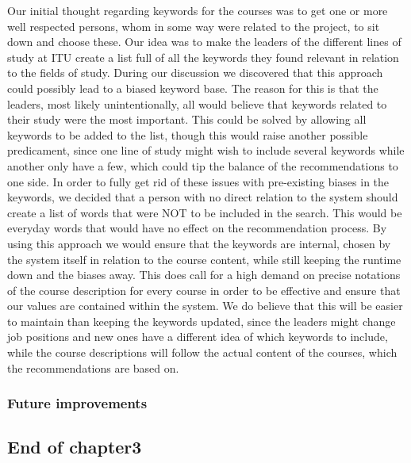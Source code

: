 Our initial thought regarding keywords for the courses was to get one or more well respected persons, whom in some way were related to the project, to sit down and choose these. Our idea was to make the leaders of the different lines of study at ITU create a list full of all the keywords they found relevant in relation to the fields of study. During our discussion we discovered that this approach could possibly lead to a biased keyword base. The reason for this is that the leaders, most likely unintentionally, all would believe that keywords related to their study were the most important. This could be solved by allowing all keywords to be added to the list, though this would raise another possible predicament, since one line of study might wish to include several keywords while another only have a few, which could tip the balance of the recommendations to one side. 
In order to fully get rid of these issues with pre-existing biases in the keywords, we decided that a person with no direct relation to the system should create a list of words that were NOT to be included in the search. This would be everyday words that would have no effect on the recommendation process. By using this approach we would ensure that the keywords are internal, chosen by the system itself in relation to the course content, while still keeping the runtime down and the biases away.
This does call for a high demand on precise notations of the course description for every course in order to be effective and ensure that our values are contained within the system. We do believe that this will be easier to maintain than keeping the keywords updated, since the leaders might change job positions and new ones have a different idea of which keywords to include, while the course descriptions will follow the actual content of the courses, which the recommendations are based on. 

\subsubsection{Future improvements} %
\label{sub:future_improvements}


\subsection{End of chapter3} %
\label{sub:end_of_chapter3}


